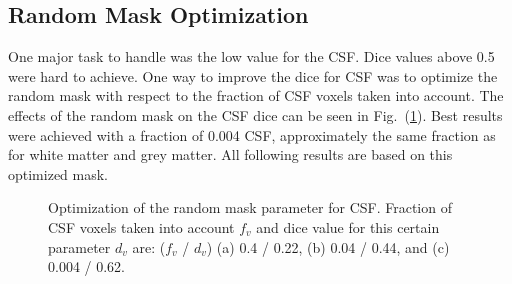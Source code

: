 \documentclass[journal]{IEEEtran}
\begin{document}
\subsection{Random Mask Optimization}

One major task to handle was the low value for the CSF. Dice values above 0.5 were hard to achieve. One way to improve the dice for CSF was to optimize the random mask with respect to the fraction of CSF voxels taken into account. The effects of the random mask on the CSF dice can be seen in Fig.~(\ref{f.random_mask}). Best results were achieved with a fraction of 0.004 CSF, approximately the same fraction as for white matter and grey matter. All following results are based on this optimized mask.
\begin{figure}[h!]
	\centering
	\hfill
	\hfill
	\caption{Optimization of the random mask parameter for CSF. Fraction of CSF voxels taken into account $f_v$ and dice value for this certain parameter $d_v$ are: ($f_v$ / $d_v$) (a) 0.4 / 0.22, (b) 0.04 / 0.44, and (c) 0.004 / 0.62.}
	\label{f.random_mask}
\end{figure}
\end{document}
